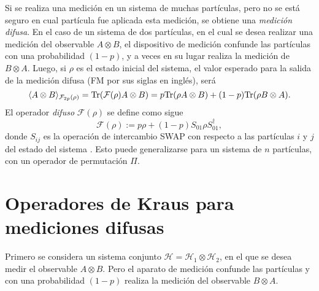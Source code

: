 Si se  realiza una  medición en un sistema de muchas partículas, pero no se
está seguro en cual partícula  fue aplicada esta medición, se obtiene una
\textit{medición difusa}. En el caso de un sistema de dos partículas, en el cual se
desea realizar una medición del observable $A\otimes B$, el dispositivo de
medición confunde las partículas con una probabilidad $(1-p)$, y a veces en su
lugar realiza la medición de $B\otimes A$. Luego, si $\rho$ es el estado
inicial del sistema, el valor esperado para la salida de la medición difusa (FM
por sus siglas en inglés), será 
\begin{equation}\label{ExpectedValue-theorginal}
    \langle A\otimes B\rangle_{\mathcal{F}_{2p}(\rho)}={\rm Tr}(\mathcal{F}(\rho)A\otimes B)=p{\rm Tr}(\rho A\otimes B)+(1-p){\rm Tr}(\rho B\otimes A).
\end{equation}
El operador \textit{difuso }$\mathcal{F}(\rho)$ se define como sigue 
\begin{equation}\label{eq:operador_difuso2p}
    \mathcal{F}(\rho):=p\rho+(1-p)S_{01}\rho S_{01}^\dagger,
\end{equation}
donde $S_{ij}$ es la operación de intercambio SWAP con respecto a las
partículas $i$ y $j$ del estado del sistema {\cite{Pineda_2021}}. Esto puede
generalizarse para un sistema de $n$ partículas, con un operador de permutación
$\Pi$.

 \section{Operadores de Kraus para mediciones difusas} %

 Primero se considera un sistema conjunto $\mathcal{H}=\mathcal{H}_1\otimes
\mathcal{H}_2$, en el que se desea medir el observable $A\otimes B$. Pero el
aparato de medición confunde las partículas y con una probabilidad $(1-p) $
realiza la medición del observable $B\otimes A$. 

   



